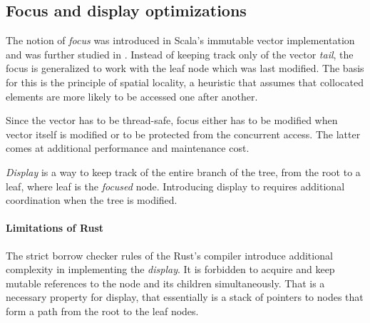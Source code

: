 


\subsection{Focus and display optimizations}
The notion of \emph{focus} was introduced in Scala's immutable vector implementation and was further studied in \cite{rrb-vector-practical-general-purpose-im-sequence}. Instead of keeping track only of the vector \emph{tail}, the focus is generalized to work with the leaf node which was last modified. The basis for this is the principle of spatial locality, a heuristic that assumes that collocated elements are more likely to be accessed one after another.

Since the vector has to be thread-safe, focus either has to be modified when vector itself is modified or to be protected from the concurrent access. The latter comes at additional performance and maintenance cost. 

\emph{Display} is a way to keep track of the entire branch of the tree, from the root to a leaf, where leaf is the \emph{focused} node. Introducing display to \rrbtree{} requires additional coordination when the tree is modified. 

\paragraph{Limitations of Rust}
The strict borrow checker rules of the Rust's compiler introduce additional complexity in implementing the \emph{display}. It is forbidden to acquire and keep mutable references to the node and its children simultaneously. That is a necessary property for display, that essentially is a stack of pointers to nodes that form a path from the root to the leaf nodes. 

